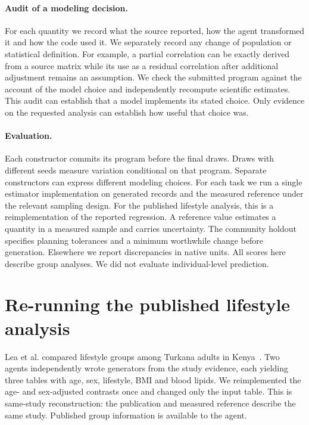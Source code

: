\documentclass[sigconf,anonymous,review]{acmart}
\begin{document}
\paragraph{Audit of a modeling decision.}
For each quantity we record what the source reported, how the agent transformed it and how the code used it. We separately record any change of population or statistical definition. For example, a partial correlation can be exactly derived from a source matrix while its use as a residual correlation after additional adjustment remains an assumption. We check the submitted program against the account of the model choice and independently recompute scientific estimates. This audit can establish that a model implements its stated choice. Only evidence on the requested analysis can establish how useful that choice was.

\paragraph{Evaluation.}
Each constructor commits its program before the final draws. Draws with different seeds measure variation conditional on that program. Separate constructors can express different modeling choices. For each task we run a single estimator implementation on generated records and the measured reference under the relevant sampling design. For the published lifestyle analysis, this is a reimplementation of the reported regression. A reference value estimates a quantity in a measured sample and carries uncertainty. The community holdout specifies planning tolerances and a minimum worthwhile change before generation. Elsewhere we report discrepancies in native units. All scores here describe group analyses. We did not evaluate individual-level prediction.

\section{Re-running the published lifestyle analysis}
\label{sec:lifestyle}
Lea et al. compared lifestyle groups among Turkana adults in Kenya~\cite{lea,leadata}. Two agents independently wrote generators from the study evidence, each yielding three tables with age, sex, lifestyle, BMI and blood lipids. We reimplemented the age- and sex-adjusted contrasts once and changed only the input table. This is same-study reconstruction: the publication and measured reference describe the same study. Published group information is available to the agent.
\end{document}
